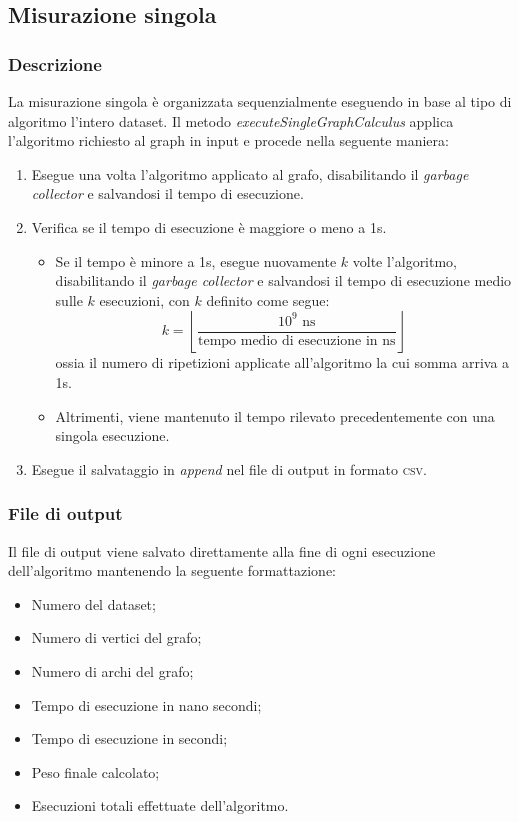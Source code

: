 \subsection{Misurazione singola}

\subsubsection{Descrizione} 

La misurazione singola è organizzata sequenzialmente eseguendo in base al tipo di algoritmo l'intero dataset. Il metodo \textit{executeSingleGraphCalculus} applica l'algoritmo richiesto al graph in input e procede nella seguente maniera:

\begin{enumerate}
    \item Esegue una volta l'algoritmo applicato al grafo, disabilitando il \textit{garbage collector} e salvandosi il tempo di esecuzione.
    \item Verifica se il tempo di esecuzione è maggiore o meno a 1s.
    \begin{itemize}
        \item Se il tempo è minore a 1s, esegue nuovamente \(k\) volte l'algoritmo, disabilitando il \textit{garbage collector} e salvandosi il tempo di esecuzione medio sulle \(k\) esecuzioni, con \(k\) definito come segue:  \[ k = \left\lfloor\frac{10^9 \textrm{ ns}}{\textrm{tempo medio di esecuzione in ns}}\right\rfloor\]
        ossia il numero di ripetizioni applicate all'algoritmo la cui somma arriva a 1s.
        \item Altrimenti, viene mantenuto il tempo rilevato precedentemente con una singola esecuzione.
    \end{itemize}
    \item Esegue il salvataggio in \textit{append} nel file di output in formato \textsc{csv}.
\end{enumerate}


\subsubsection{File di output}

Il file di output viene salvato direttamente alla fine di ogni esecuzione dell'algoritmo mantenendo la seguente formattazione:
\begin{itemize}
    \item Numero del dataset;
    \item Numero di vertici del grafo;
    \item Numero di archi del grafo;
    \item Tempo di esecuzione in nano secondi;
    \item Tempo di esecuzione in secondi;
    \item Peso finale calcolato;
    \item Esecuzioni totali effettuate dell'algoritmo.
\end{itemize}


